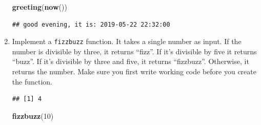 \documentclass[]{book}
\newenvironment{Shaded}{\begin{snugshade}}{\end{snugshade}}
\newcommand{\ControlFlowTok}[1]{\textcolor[rgb]{0.13,0.29,0.53}{\textbf{#1}}}
\newcommand{\DecValTok}[1]{\textcolor[rgb]{0.00,0.00,0.81}{#1}}
\newcommand{\KeywordTok}[1]{\textcolor[rgb]{0.13,0.29,0.53}{\textbf{#1}}}
\newcommand{\NormalTok}[1]{#1}
\newcommand{\OperatorTok}[1]{\textcolor[rgb]{0.81,0.36,0.00}{\textbf{#1}}}
\newcommand{\StringTok}[1]{\textcolor[rgb]{0.31,0.60,0.02}{#1}}
\theoremstyle{definition}
\theoremstyle{definition}
\theoremstyle{definition}
\theoremstyle{remark}
\begin{document}
\begin{enumerate}
\begin{Shaded}
\begin{Highlighting}[]
\KeywordTok{greeting}\NormalTok{(}\KeywordTok{now}\NormalTok{())}
\end{Highlighting}
\end{Shaded}

\begin{verbatim}
## good evening, it is: 2019-05-22 22:32:00
\end{verbatim}
\item
  Implement a \texttt{fizzbuzz} function. It takes a single number as
  input. If the number is divisible by three, it returns ``fizz''. If
  it's divisible by five it returns ``buzz''. If it's divisible by three
  and five, it returns ``fizzbuzz''. Otherwise, it returns the number.
  Make sure you first write working code before you create the function.

\begin{Shaded}
\end{Shaded}

\begin{verbatim}
## [1] 4
\end{verbatim}

\begin{Shaded}
\begin{Highlighting}[]
\KeywordTok{fizzbuzz}\NormalTok{(}\DecValTok{10}\NormalTok{)}
\end{Highlighting}
\end{Shaded}


\end{enumerate}
\end{document}
